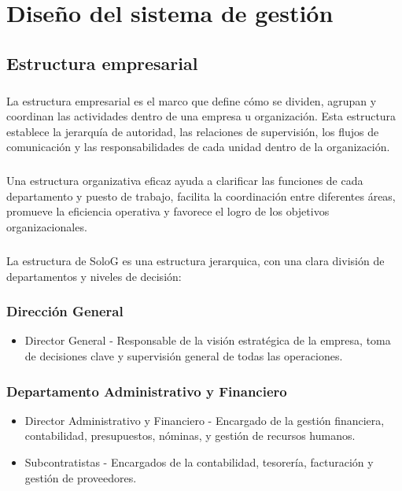 \documentclass{report}
\begin{document}
    \chapter{Diseño del sistema de gestión}
        \section{Estructura empresarial}
          \paragraph*{}{
            La estructura empresarial es el marco que define cómo se dividen, agrupan y coordinan las actividades dentro de una empresa u organización. 
            Esta estructura establece la jerarquía de autoridad, las relaciones de supervisión, los flujos de comunicación y las responsabilidades de cada unidad dentro de la organización.
          }
          \paragraph*{}
          {
            Una estructura organizativa eficaz ayuda a clarificar las funciones de cada departamento y puesto de trabajo, facilita la coordinación entre diferentes áreas, promueve la eficiencia operativa y favorece el logro de los objetivos organizacionales.
          }
          \paragraph*{}
          {
            La estructura de SoloG es una estructura jerarquica, con una clara división de departamentos y niveles de decisión:
          }
          \subsection{Dirección General}
            \begin{itemize}
            \item Director General - Responsable de la visión estratégica de la empresa, toma de decisiones clave y supervisión general de todas las operaciones.
            \end{itemize}
          \subsection{Departamento Administrativo y Financiero}
            \begin{itemize}
            \item Director Administrativo y Financiero - Encargado de la gestión financiera, contabilidad, presupuestos, nóminas, y gestión de recursos humanos.
            \item Subcontratistas - Encargados de la contabilidad, tesorería, facturación y gestión de proveedores.
            \end{itemize}
\end{document}
